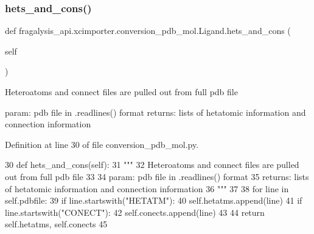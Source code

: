 \subsubsection{\texorpdfstring{hets\+\_\+and\+\_\+cons()}{hets\_and\_cons()}}
{\footnotesize\ttfamily def fragalysis\+\_\+api.\+xcimporter.\+conversion\+\_\+pdb\+\_\+mol.\+Ligand.\+hets\+\_\+and\+\_\+cons (\begin{DoxyParamCaption}\item[{}]{self }\end{DoxyParamCaption})}

\begin{DoxyVerb}Heteroatoms and connect files are pulled out from full pdb file

param: pdb file in .readlines() format
returns: lists of hetatomic information and connection information
\end{DoxyVerb}
 

Definition at line 30 of file conversion\+\_\+pdb\+\_\+mol.\+py.


\begin{DoxyCode}
30     \textcolor{keyword}{def }hets\_and\_cons(self):
31         \textcolor{stringliteral}{"""}
32 \textcolor{stringliteral}{        Heteroatoms and connect files are pulled out from full pdb file}
33 \textcolor{stringliteral}{}
34 \textcolor{stringliteral}{        param: pdb file in .readlines() format}
35 \textcolor{stringliteral}{        returns: lists of hetatomic information and connection information}
36 \textcolor{stringliteral}{        """}
37 
38         \textcolor{keywordflow}{for} line \textcolor{keywordflow}{in} self.pdbfile:
39             \textcolor{keywordflow}{if} line.startswith(\textcolor{stringliteral}{"HETATM"}):
40                 self.hetatms.append(line)
41             \textcolor{keywordflow}{if} line.startswith(\textcolor{stringliteral}{"CONECT"}):
42                 self.conects.append(line)
43 
44         \textcolor{keywordflow}{return} self.hetatms, self.conects
45 
\end{DoxyCode}
\mbox{\label{classfragalysis__api_1_1xcimporter_1_1conversion__pdb__mol_1_1_ligand_af21865a4bb9be6aab21bfc82668ba25e}} 
